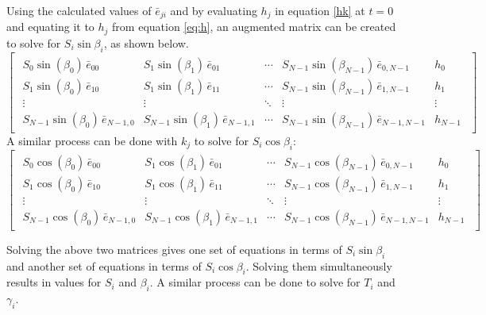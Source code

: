 \documentclass[11pt, oneside]{article}   	%
\begin{document}
Using the calculated values of $\bar{e}_{ji}$ and by evaluating $h_{j}$ in equation \ref{hk} at $t=0$ and equating it to $h_{j}$ from equation \ref{eq:h}, an augmented matrix can be created to solve for $S_{i} \sin \beta_{i}$, as shown below.
\begin{equation}
\begin{bmatrix}
\begin{array}{cccc|c}
  S_{0}\sin( \beta_{0})\,\bar{e}_{00} & S_{1}\sin( \beta_{1})\,\bar{e}_{01} & \cdots &  S_{N-1}\sin( \beta_{N-1})\,\bar{e}_{0,N-1} &  h_{0}\\
  S_{1}\sin( \beta_{0})\,\bar{e}_{10} & S_{1}\sin( \beta_{1})\,\bar{e}_{11} & \cdots &  S_{N-1}\sin( \beta_{N-1})\,\bar{e}_{1,N-1} &  h_{1}\\
  \vdots & \vdots & \ddots & \vdots & \vdots \\
  S_{N-1}\sin( \beta_{0})\,\bar{e}_{N-1,0} & S_{N-1}\sin( \beta_{1})\,\bar{e}_{N-1,1} & \cdots &  S_{N-1}\sin( \beta_{N-1})\,\bar{e}_{N-1,N-1} &  h_{N-1}
\end{array}
\end{bmatrix}
\end{equation}
A similar process can be done with $k_{j}$ to solve for $S_{i}\cos \beta_{i}$:
\begin{equation}
\begin{bmatrix}
\begin{array}{cccc|c}
  S_{0}\cos( \beta_{0})\,\bar{e}_{00} & S_{1}\cos( \beta_{1})\,\bar{e}_{01} & \cdots &  S_{N-1}\cos( \beta_{N-1})\,\bar{e}_{0,N-1} &  h_{0}\\
  S_{1}\cos( \beta_{0})\,\bar{e}_{10} & S_{1}\cos( \beta_{1})\,\bar{e}_{11} & \cdots &  S_{N-1}\cos( \beta_{N-1})\,\bar{e}_{1,N-1} &  h_{1}\\
  \vdots & \vdots & \ddots & \vdots & \vdots \\
  S_{N-1}\cos( \beta_{0})\,\bar{e}_{N-1,0} & S_{N-1}\cos( \beta_{1})\,\bar{e}_{N-1,1} & \cdots &  S_{N-1}\cos( \beta_{N-1})\,\bar{e}_{N-1,N-1} &  h_{N-1}
\end{array}
\end{bmatrix}
\end{equation}

Solving the above two matrices gives one set of equations in terms of $S_{i} \sin \beta_{i}$ and another set of equations in terms of $S_{i} \cos \beta_{i}$. Solving them simultaneously results in values for $S_{i}$ and $\beta_{i}$. A similar process can be done to solve for $T_{i}$ and $\gamma_{i}$.
\end{document}
